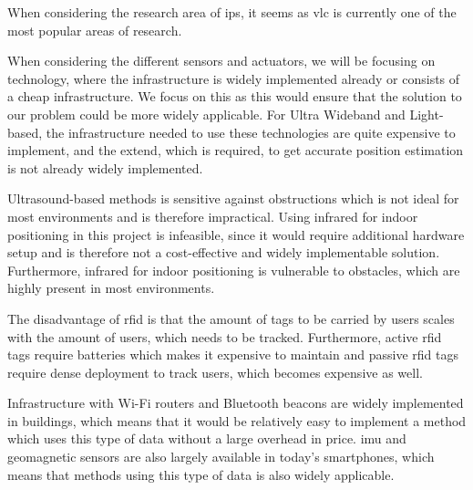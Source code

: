 When considering the research area of \gls{ips}, it seems as \gls{vlc} is currently one of the most popular areas of research.\cite{8911806, 8935876, 9170801, 9069785}


When considering the different sensors and actuators, we will be focusing on technology, where the infrastructure is widely implemented already or consists of a cheap infrastructure. We focus on this as this would ensure that the solution to our problem could be more widely applicable. For Ultra Wideband and Light-based, the infrastructure needed to use these technologies are quite expensive to implement, and the extend, which is required, to get accurate position estimation is not already widely implemented.

Ultrasound-based methods is sensitive against obstructions which is not ideal for most environments and is therefore impractical.
Using infrared for indoor positioning in this project is infeasible, since it would require additional hardware setup and is therefore not a cost-effective and widely implementable solution. Furthermore, infrared for indoor positioning is vulnerable to obstacles, which are highly present in most environments.

The disadvantage of \gls{rfid} is that the amount of tags to be carried by users scales with the amount of users, which needs to be tracked. Furthermore, active \gls{rfid} tags require batteries which makes it expensive to maintain and passive \gls{rfid} tags require dense deployment to track users, which becomes expensive as well.

Infrastructure with Wi-Fi routers and Bluetooth beacons are widely implemented in buildings, which means that it would be relatively easy to implement a method which uses this type of data without a large overhead in price. \gls{imu} and geomagnetic sensors are also largely available in today's smartphones, which means that methods using this type of data is also widely applicable.




